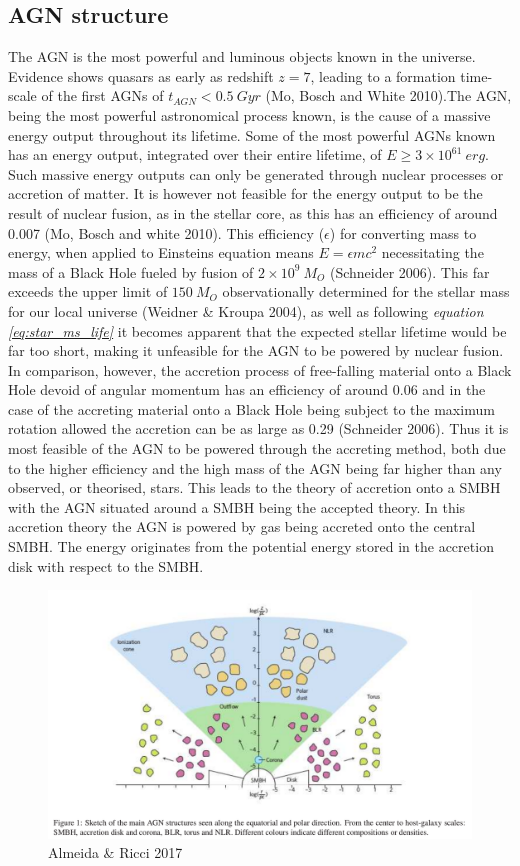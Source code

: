 \documentclass[a4paper, 12pt, twoside]{article}
\begin{document}
\subsection{AGN structure}
The AGN is the most powerful and luminous objects known in the universe. Evidence shows quasars as early as redshift $z=7$, leading to a formation time-scale of the first AGNs of $t_{AGN}<0.5\ Gyr$ (Mo, Bosch and White 2010).The AGN, being the most powerful astronomical process known, is the cause of a massive energy output throughout its lifetime. Some of the most powerful AGNs known has an energy output, integrated over their entire lifetime, of $E\geq 3\times 10^{61}\ erg$. Such massive energy outputs can only be generated through nuclear processes or accretion of matter. It is however not feasible for the energy output to be the result of nuclear fusion, as in the stellar core, as this has an efficiency of around 0.007 (Mo, Bosch and white 2010). This efficiency ($\epsilon$) for converting mass to energy, when applied to Einsteins equation means $E=\epsilon mc^{2}$ necessitating the mass of a Black Hole fueled by fusion of $2\times 10^{9}\ M_{O}$ (Schneider 2006). This far exceeds the upper limit of $150\ M_{O}$ observationally determined for the stellar mass for our local universe (Weidner \& Kroupa 2004), as well as following \emph{equation \ref{eq:star_ms_life}} it becomes apparent that the expected stellar lifetime would be far too short, making it unfeasible for the AGN to be powered by nuclear fusion. In comparison, however, the accretion process of free-falling material onto a Black Hole devoid of angular momentum has an efficiency of around 0.06 and in the case of the accreting material onto a Black Hole being subject to the maximum rotation allowed the accretion can be as large as 0.29 (Schneider 2006). Thus it is most feasible of the AGN to be powered through the accreting method, both due to the higher efficiency and the high mass of the AGN being far higher than any observed, or theorised, stars. This leads to the theory of accretion onto a SMBH with the AGN situated around a SMBH being the accepted theory. In this accretion theory the AGN is powered by gas being accreted onto the central SMBH. The energy originates from the potential energy stored in the accretion disk with respect to the SMBH. 
\begin{figure}[htp]
\centering
\includegraphics[width=1.00\linewidth]{Figure/AGN_structure.png}
\caption{Almeida \& Ricci 2017\cite{Almeida2017}}
\label{fig:AGN_structure}
\end{figure}
\end{document}
